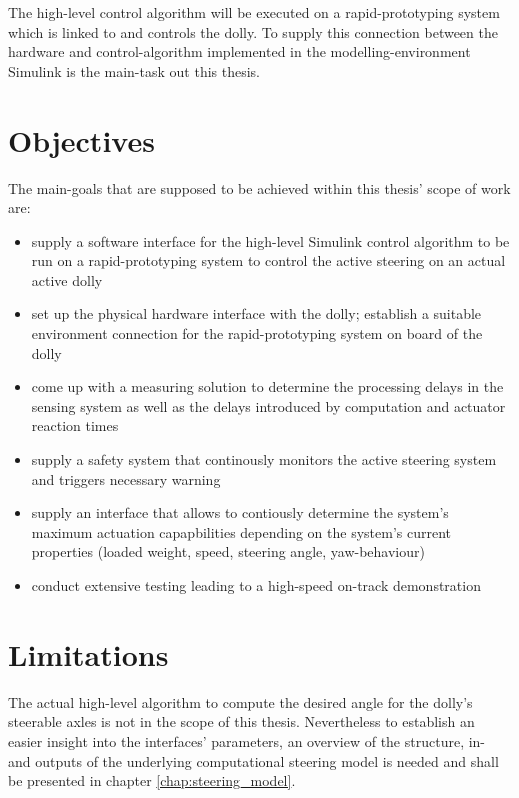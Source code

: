 \documentclass[ExampleMasters.tex]{subfiles}
\begin{document}
The high-level control algorithm will be executed on a rapid-prototyping system which is linked to and controls the dolly. To supply this connection between the hardware and control-algorithm implemented in the modelling-environment Simulink is the main-task out this thesis.   

\section{Objectives}
\label{sec:objectives}
The main-goals that are supposed to be achieved within this thesis' scope of work are: 

\begin{itemize}
	\item{supply a software interface for the high-level Simulink control algorithm to be run on a rapid-prototyping system to control the active steering on an actual active dolly}
	\item{set up the physical hardware interface with the dolly; establish a suitable environment connection for the rapid-prototyping system on board of the dolly} 
	\item{come up with a measuring solution to determine the processing delays in the sensing system as well as the delays introduced by computation and actuator reaction times}  
	\item{supply a safety system that continously monitors the active steering system and triggers necessary warning}
	\item{supply an interface that allows to contiously determine the system's maximum actuation capapbilities depending on the system's current properties (loaded weight, speed, steering angle, yaw-behaviour) }
	\item{conduct extensive testing leading to a high-speed on-track demonstration}
	
\end{itemize}



\section{Limitations}
\label{sec:limitations}
The actual high-level algorithm to compute the desired angle for the dolly's steerable axles is not in the scope of this thesis. Nevertheless to establish an easier insight into the interfaces' parameters, an overview of the structure, in- and outputs of the underlying computational steering model is needed and shall be presented in chapter \ref{chap:steering_model}. 
\end{document}
